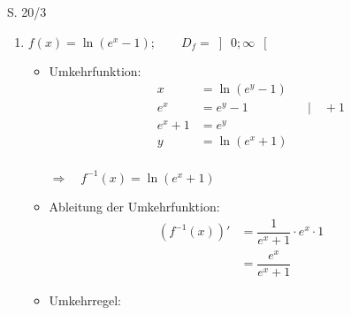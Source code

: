 \begin{Exercise}{S. 20/3}{}
\begin{enumerate}
\begin{enumerate}[label=\alph*)]
{\begin{itemize}[leftmargin=*]
{\begin{align*}
                            &= \dfrac{1}{-\dfrac{1}{2} \cdot \left[-\left(-x^{2} + 2\right) + 2\right]^{-\frac{1}{2}}} && \\[1.5ex]
                            &= \dfrac{1}{-\dfrac{1}{2} \cdot \left(x^{2}\right)^{-\frac{1}{2}}} && \\[1.5ex]
                            &= -2 \cdot\dfrac{1}{\left(x^{2}\right)^{-\frac{1}{2}}} && \\[1.5ex]
                            &= -2 \cdot\dfrac{1}{x^{-1}} && \\[1.5ex]
                            &= -2 \cdot x &&
                        \end{align*}
                        }
                \end{itemize}
                }
            \item[b)] {
                $f(x) = \ln(e^{x}-1); \qquad D_{f} = \left] \ 0; \infty \ \right[$\\[-2.0ex]
                \begin{itemize}[leftmargin=*]
                    \item Umkehrfunktion: \\{
                        \vspace{-2.0ex}
                        \begin{align*}
                            x &= \ln(e^{y}-1) &&\\[1.5ex]
                            e^{x} &= e^{y} - 1 &&| \quad +1\\[1.5ex]
                            e^{x} + 1 &= e^{y} &&\\[1.5ex]
                            y &= \ln\left(e^{x} + 1\right) &&
                        \end{align*}\\[-2.0ex]
                        $\Rightarrow \quad f^{-1}(x) = \ln\left(e^{x} + 1\right)$\\[-2.0ex]
                        }
                    \item Ableitung der Umkehrfunktion: \\[-2.0ex]{
                        \begin{align*}
                            \left(f^{-1}(x)\right)' &= \dfrac{1}{e^{x} + 1} \cdot e^{x} \cdot 1&&\\[1.5ex]
                            &= \dfrac{e^{x}}{e^{x} + 1} &&
                        \end{align*}
                        }
                    \item Umkehrregel: \\[-2.0ex]{
}
\end{itemize}}
\end{enumerate}
\end{enumerate}
\end{Exercise}
